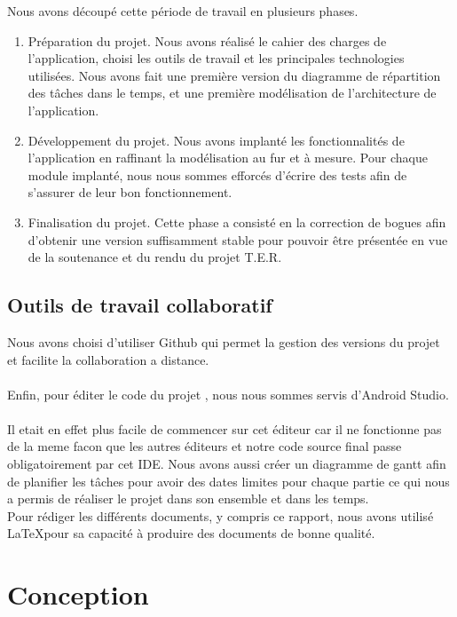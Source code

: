 \documentclass{article}
\begin{document}
Nous avons découpé cette période de travail en plusieurs phases.
\begin{enumerate}
    \item Préparation du projet. Nous avons réalisé le cahier des charges de l’application, choisi les
          outils de travail et les principales technologies utilisées. Nous avons fait une première version
          du diagramme de répartition des tâches dans le temps, et une première modélisation de
          l’architecture de l’application.
\item Développement du projet. Nous avons implanté les fonctionnalités de l’application en
raffinant la modélisation au fur et à mesure. Pour chaque module implanté, nous nous sommes
efforcés d’écrire des tests afin de s’assurer de leur bon fonctionnement.
\item Finalisation du projet. Cette phase a consisté en la correction de bogues afin d’obtenir une
version suffisamment stable pour pouvoir être présentée en vue de la soutenance et du rendu
du projet T.E.R.
\end{enumerate}
\newpage

\subsection{Outils de travail collaboratif }
Nous avons choisi d’utiliser Github qui  permet la gestion des versions du projet et facilite la collaboration a distance.\\\\
Enfin, pour éditer le code du projet , nous nous sommes servis d'Android Studio.\\\\
Il etait en effet plus facile de commencer sur cet éditeur car il ne fonctionne pas de la meme facon que les autres éditeurs et notre code source final passe obligatoirement par cet IDE.
Nous avons aussi créer un diagramme de gantt afin de planifier les tâches pour avoir des dates limites pour chaque partie ce qui nous a permis de réaliser le projet dans son ensemble et dans les temps.\\
\newline Pour rédiger les différents documents, y compris ce rapport, nous
avons utilisé \LaTeX  pour sa capacité à produire des documents de bonne qualité.


\section{Conception}
\end{document}
